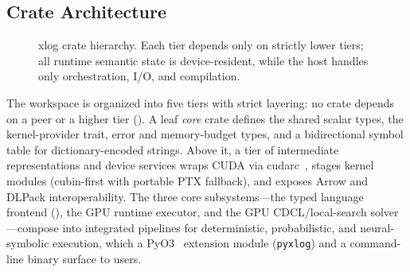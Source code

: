 \subsection{Crate Architecture}

\begin{figure}[tbp]
  \centering
  \caption{xlog crate hierarchy. Each tier depends only on strictly lower tiers; all runtime semantic state is device-resident, while the host handles only orchestration, I/O, and compilation.}
  \label{fig:arch}
\end{figure}

The workspace is organized into five tiers with strict layering: no crate depends on a peer or a higher tier (). A leaf \emph{core} crate defines the shared scalar types, the kernel-provider trait, error and memory-budget types, and a bidirectional symbol table for dictionary-encoded strings. Above it, a tier of intermediate representations and device services wraps CUDA via cudarc~\cite{cudarc}, stages kernel modules (cubin-first with portable PTX fallback), and exposes Arrow and DLPack interoperability. The three core subsystems---the typed language frontend (), the GPU runtime executor, and the GPU CDCL/local-search solver---compose into integrated pipelines for deterministic, probabilistic, and neural-symbolic execution, which a PyO3~\cite{pyo3} extension module (\texttt{pyxlog}) and a command-line binary surface to users.

